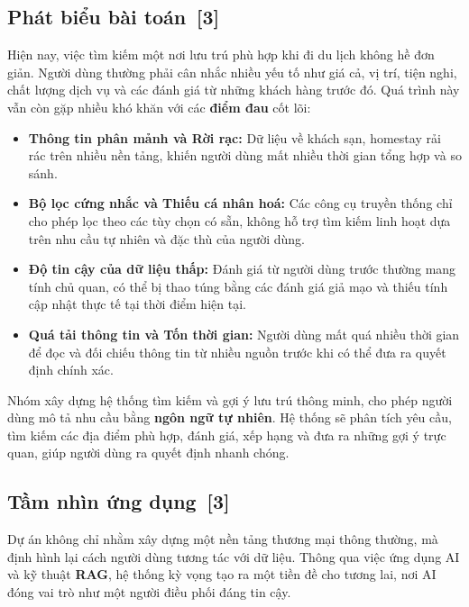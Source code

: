 \documentclass[12pt, a4paper]{article}
\begin{document}
\subsection[Phát biểu bài toán]{Phát biểu bài toán \,{\normalfont\small\textcolor{cyan!70!black}{[3]}}}
Hiện nay, việc tìm kiếm một nơi lưu trú phù hợp khi đi du lịch không hề đơn giản. Người dùng thường phải cân nhắc nhiều yếu tố như giá cả, vị trí, tiện nghi, chất lượng dịch vụ và các đánh giá từ những khách hàng trước đó. Quá trình này vẫn còn gặp nhiều khó khăn với các \textbf{điểm đau} cốt lõi:

\begin{itemize}[label=\textcolor{blue!70!black}{\faTimesCircle}]
  \item \textbf{Thông tin phân mảnh và Rời rạc:} Dữ liệu về khách sạn, homestay rải rác trên nhiều nền tảng, khiến người dùng mất nhiều thời gian tổng hợp và so sánh.
  \item \textbf{Bộ lọc cứng nhắc và Thiếu cá nhân hoá:} Các công cụ truyền thống chỉ cho phép lọc theo các tùy chọn có sẵn, không hỗ trợ tìm kiếm linh hoạt dựa trên nhu cầu tự nhiên và đặc thù của người dùng.
  \item \textbf{Độ tin cậy của dữ liệu thấp:} Đánh giá từ người dùng trước thường mang tính chủ quan, có thể bị thao túng bằng các đánh giá giả mạo và thiếu tính cập nhật thực tế tại thời điểm hiện tại.
  \item \textbf{Quá tải thông tin và Tốn thời gian:} Người dùng mất quá nhiều thời gian để đọc và đối chiếu thông tin từ nhiều nguồn trước khi có thể đưa ra quyết định chính xác.
\end{itemize}

\begin{infobox}
Nhóm xây dựng hệ thống tìm kiếm và gợi ý lưu trú thông minh, cho phép người dùng mô tả nhu cầu bằng \textbf{ngôn ngữ tự nhiên}. Hệ thống sẽ phân tích yêu cầu, tìm kiếm các địa điểm phù hợp, đánh giá, xếp hạng và đưa ra những gợi ý trực quan, giúp người dùng ra quyết định nhanh chóng.
\end{infobox}

\subsection[Tầm nhìn ứng dụng]{Tầm nhìn ứng dụng \,{\normalfont\small\textcolor{cyan!70!black}{[3]}}}
Dự án không chỉ nhằm xây dựng một nền tảng thương mại thông thường, mà định hình lại cách người dùng tương tác với dữ liệu. Thông qua việc ứng dụng AI và kỹ thuật \textbf{RAG}, hệ thống kỳ vọng tạo ra một tiền đề cho tương lai, nơi AI đóng vai trò như một người điều phối đáng tin cậy.
\end{document}
